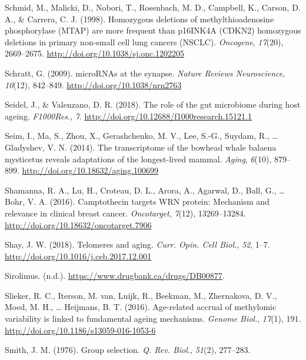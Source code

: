\documentclass[12pt,twoside]{unicam}
\begin{document}
\begin{cslreferences}
\leavevmode\hypertarget{ref-Schmid1998}{}%
Schmid, M., Malicki, D., Nobori, T., Rosenbach, M. D., Campbell, K., Carson, D. A., \& Carrera, C. J. (1998). Homozygous deletions of methylthioadenosine phosphorylase (MTAP) are more frequent than p16INK4A (CDKN2) homozygous deletions in primary non-small cell lung cancers (NSCLC). \emph{Oncogene}, \emph{17}(20), 2669--2675. \url{http://doi.org/10.1038/sj.onc.1202205}

\leavevmode\hypertarget{ref-Schratt2009}{}%
Schratt, G. (2009). microRNAs at the synapse. \emph{Nature Reviews Neuroscience}, \emph{10}(12), 842--849. \url{http://doi.org/10.1038/nrn2763}

\leavevmode\hypertarget{ref-Seidel2018}{}%
Seidel, J., \& Valenzano, D. R. (2018). The role of the gut microbiome during host ageing. \emph{F1000Res.}, \emph{7}. \url{http://doi.org/10.12688/f1000research.15121.1}

\leavevmode\hypertarget{ref-Seim2014}{}%
Seim, I., Ma, S., Zhou, X., Gerashchenko, M. V., Lee, S.-G., Suydam, R., \ldots{} Gladyshev, V. N. (2014). The transcriptome of the bowhead whale balaena mysticetus reveals adaptations of the longest-lived mammal. \emph{Aging}, \emph{6}(10), 879--899. \url{http://doi.org/10.18632/aging.100699}

\leavevmode\hypertarget{ref-Shamanna2016}{}%
Shamanna, R. A., Lu, H., Croteau, D. L., Arora, A., Agarwal, D., Ball, G., \ldots{} Bohr, V. A. (2016). Camptothecin targets WRN protein: Mechanism and relevance in clinical breast cancer. \emph{Oncotarget}, \emph{7}(12), 13269--13284. \url{http://doi.org/10.18632/oncotarget.7906}

\leavevmode\hypertarget{ref-Shay2018}{}%
Shay, J. W. (2018). Telomeres and aging. \emph{Curr. Opin. Cell Biol.}, \emph{52}, 1--7. \url{http://doi.org/10.1016/j.ceb.2017.12.001}

\leavevmode\hypertarget{ref-Sirolimus}{}%
Sirolimus. (n.d.). \url{https://www.drugbank.ca/drugs/DB00877}.

\leavevmode\hypertarget{ref-Slieker2016}{}%
Slieker, R. C., Iterson, M. van, Luijk, R., Beekman, M., Zhernakova, D. V., Moed, M. H., \ldots{} Heijmans, B. T. (2016). Age-related accrual of methylomic variability is linked to fundamental ageing mechanisms. \emph{Genome Biol.}, \emph{17}(1), 191. \url{http://doi.org/10.1186/s13059-016-1053-6}

\leavevmode\hypertarget{ref-Smith1976}{}%
Smith, J. M. (1976). Group selection. \emph{Q. Rev. Biol.}, \emph{51}(2), 277--283.


\end{cslreferences}
\end{document}
